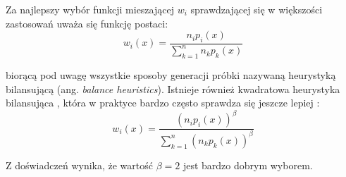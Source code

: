 \documentclass[../main.tex]{subfiles}
\begin{document}
Za najlepszy wybór funkcji mieszającej $w_i$ sprawdzającej się w większości zastosowań uważa się funkcję postaci:
\begin{equation}
  w_{i}(x) = \frac{
    n_{i} p_{i}(x)
  }{
    \sum_{k=1}^{n} {
      n_{k} p_{k}(x)
    }
  }
\end{equation}

\noindent biorącą pod uwagę wszystkie sposoby generacji próbki nazywaną heurystyką bilansującą (ang. \textit{balance heuristics}). Istnieje również kwadratowa heurystyka bilansująca \cite{pbrt}, która w praktyce bardzo często sprawdza się jeszcze lepiej \cite{pbrt,Veach}:
\begin{equation}
  w_{i}(x) = 
  \frac{
	\left( n_{i} p_{i}(x) \right)^{\beta}
  }{
	\sum_{k=1}^{n} {
		\left(n_{k} p_{k}(x)\right)^{\beta}
	}
  }
\end{equation}

Z doświadczeń \cite{Veach} wynika, że wartość $\beta = 2$ jest bardzo dobrym wyborem.
\end{document}
